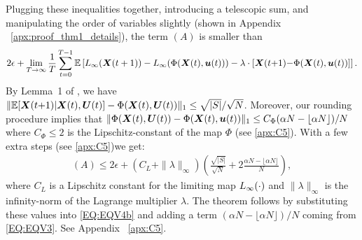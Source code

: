 Plugging these inequalities together, introducing a telescopic sum, and manipulating the order of variables slightly (shown in Appendix %
~\ref{apx:proof_thm1_details}), the term $(A)$ is smaller than
\begin{align}
    \label{EQ:EQV4}
    2\epsilon + \lim_{T\to\infty}  \frac{1}{T}\sum_{t = 0}^{T - 1} \E \left[\Costmin{\infty}{\mX(t + 1)} - \Costmin{\infty}{\Phi(\mX(t), \bu(t))} - \lambda\cdot [\mX(t {+} 1) {-} \Phi(\mX(t), \bu(t))] \right].%
\end{align}
By Lemma~1 of \cite{GGY23b}, we have $\|\mathbb{E} [{\bm{X}}(t {+} 1)| {\bm{X}}(t), \bm{U}(t)] - \Phi({\bm{X}}(t), \bm{U}(t))\|_1 \le \sqrt{|S|}/\sqrt{N}$. Moreover, our rounding procedure implies that $\|\Phi({\bm{X}}(t), \bm{U}(t))-\Phi({\bm{X}}(t), \bm{u}(t))\|_1\le C_\Phi(\alpha N - \lfloor\alpha N\rfloor)/N$ where $C_\Phi\le2$ is the Lipschitz-constant of the map $\Phi$ %
(see \ref{apx:C5}). With a few extra steps (see \ref{apx:C5})we get:%
\begin{align}
    \label{EQ:EQV4b}
    (A) \le 2\epsilon + (C_{L} + \|\lambda\|_\infty) \left(\frac{\sqrt{|S|}}{\sqrt{N}} + 2\frac{\alpha N - \lfloor\alpha N\rfloor}{N} \right),
\end{align}
where $C_{L}$ is a Lipschitz constant for the limiting map $L_{\infty}(\cdot)$ and $\|\lambda\|_\infty$ is the infinity-norm of the Lagrange multiplier $\lambda$.   The theorem follows by substituting these values into \eqref{EQ:EQV4b} and adding a term $(\alpha N - \lfloor{\alpha N}\rfloor)/N$ coming from \eqref{EQ:EQV3}. See Appendix %
~\ref{apx:C5}.

